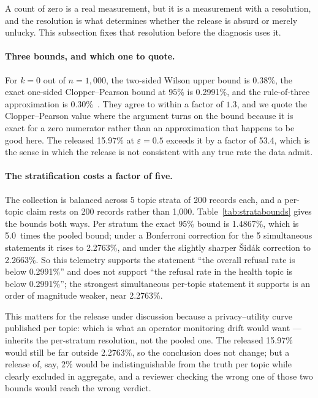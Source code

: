 \documentclass[journal]{IEEEtran}
\providecommand{\citep}[1]{\cite{#1}}
\theoremstyle{definition}
\newcommand{\WilsonUp}{0.38}
\newcommand{\RuleThree}{0.30}
\newcommand{\WorstEps}{0.5}
\newcommand{\WorstRelease}{15.97}
\newcommand{\TNtel}{1{,}000}
\newcommand{\TNper}{200}
\newcommand{\TNstrata}{5}
\newcommand{\TCpPooled}{0.2991}
\newcommand{\TCpPerStratum}{1.4867}
\newcommand{\TCpRatio}{5.0}
\newcommand{\TBonf}{2.2763}
\newcommand{\TSidak}{2.2663}
\newcommand{\TRelRatio}{53.4}
\begin{document}
A count of zero is a real measurement, but it is a measurement with a
resolution, and the resolution is what determines whether the release is
absurd or merely unlucky. This subsection fixes that resolution before the
diagnosis uses it.

\paragraph{Three bounds, and which one to quote.} For $k=0$ out of
$n=\TNtel$, the two-sided Wilson upper bound is \WilsonUp\%, the exact one-sided
Clopper--Pearson bound at $95$\% is \TCpPooled\%, and the rule-of-three
approximation is \RuleThree\%~\citep{hanley1983zero, clopper1934confidence,
wilson1927interval}. They agree to within a factor of \(1.3\), and we quote the
Clopper--Pearson value where the argument turns on the bound because it is exact
for a zero numerator rather than an approximation that happens to be good here.
The released \WorstRelease\% at $\varepsilon=\WorstEps$ exceeds it by a factor of
\TRelRatio, which is the sense in which the release is not consistent with any
true rate the data admit.

\paragraph{The stratification costs a factor of five.} The collection is
balanced across \TNstrata{} topic strata of \TNper{} records each, and a
per-topic claim rests on \TNper{} records rather than \TNtel{}.
Table~\ref{tab:stratabounds} gives the bounds both ways. Per stratum the exact
$95$\% bound is \TCpPerStratum\%, which is \TCpRatio\ times the pooled bound;
under a Bonferroni correction for the \TNstrata{} simultaneous statements it
rises to \TBonf\%, and under the slightly sharper {\v S}id{\'a}k correction to
\TSidak\%. So this telemetry supports the statement ``the overall refusal rate is
below \TCpPooled\%'' and does not support ``the refusal rate in the health topic
is below \TCpPooled\%''; the strongest simultaneous per-topic statement it
supports is an order of magnitude weaker, near \TBonf\%.

This matters for the release under discussion because a privacy--utility curve
published per topic: which is what an operator monitoring drift would want
--- inherits the per-stratum resolution, not the pooled one. The released
\WorstRelease\% would still be far outside \TBonf\%, so the conclusion does not
change; but a release of, say, $2$\% would be indistinguishable from the truth
per topic while clearly excluded in aggregate, and a reviewer checking the wrong
one of those two bounds would reach the wrong verdict.
\end{document}
